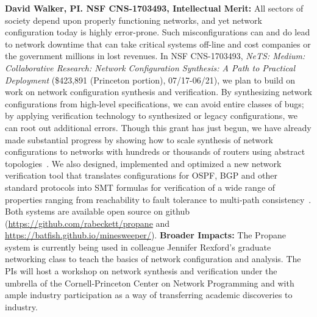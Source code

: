 \noindent
{\bf David Walker, PI. NSF CNS-1703493, Intellectual Merit:}
All sectors of society depend upon properly functioning networks, and
yet network configuration today is highly error-prone.  Such misconfigurations
can and do lead to network downtime that can take critical systems off-line
and cost companies or the government millions in lost revenues.
In NSF CNS-1703493, \emph{NeTS: Medium: Collaborative Research: Network Configuration Synthesis: A Path to Practical Deployment}
(\$423,891 (Princeton portion), 07/17-06/21), we plan to build on work on network configuration
synthesis and verification.  By synthesizing network configurations from
high-level specifications, we can avoid entire classes of bugs; by applying
verification technology to synthesized or legacy configurations, we can 
root out additional errors.  Though this grant has just begun, we have already
made substantial progress by showing how to scale synthesis of network configurations to networks with hundreds or thousands of routers using abstract topologies~\cite{propane-at}.  We also designed, implemented and optimized a new
network verification tool that translates configurations for OSPF, BGP and
other standard protocols into SMT formulas for verification of a wide range
of properties ranging from reachability to fault tolerance to multi-path
consistency~\cite{minesweeper}.  Both systems are available open source
on github (\url{https://github.com/rabeckett/propane} and \url{https://batfish.github.io/minesweeper/}).
{\bf Broader Impacts:} The Propane system is currently being used in 
colleague Jennifer Rexford's graduate networking class to teach the basics
of network configuration and analysis.  The PIs will host
a workshop on network synthesis and verification under the umbrella of the 
Cornell-Princeton Center on Network Programming and with ample industry 
participation as a way of transferring academic discoveries to industry.




